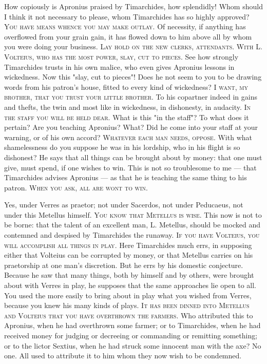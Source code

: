  How copiously is Apronius praised by Timarchides, how splendidly! Whom should I think it not necessary to please, whom Timarchides has so highly approved? \textsc{You have means whence you may make outlay}. Of necessity, if anything has overflowed from your grain gain, it has flowed down to him above all by whom you were doing your business. \textsc{Lay hold on the new clerks, attendants. With L. Volteius, who has the most power, slay, cut to pieces}. See how strongly Timarchides trusts in his own malice, who even gives Apronius lessons in wickedness. Now this "slay, cut to pieces"! Does he not seem to you to be drawing words from his patron's house, fitted to every kind of wickedness? \textsc{I want, my brother, that you trust your little brother}. To his copartner indeed in gains and thefts, the twin and most like in wickedness, in dishonesty, in audacity. \textsc{In the staff you will be held dear}. What is this "in the staff"? To what does it pertain? Are you teaching Apronius? What? Did he come into your staff at your warning, or of his own accord? \textsc{Whatever each man needs, oppose}. With what shamelessness do you suppose he was in his lordship, who in his flight is so dishonest? He says that all things can be brought about by money: that one must give, must spend, if one wishes to win. This is not so troublesome to me --- that Timarchides advises Apronius --- as that he is teaching the same thing to his patron. \textsc{When you ask, all are wont to win}.

 Yes, under Verres as praetor; not under Sacerdos, not under Peducaeus, not under this Metellus himself. \textsc{You know that Metellus is wise}. This now is not to be borne: that the talent of an excellent man, L. Metellus, should be mocked and contemned and despised by Timarchides the runaway. \textsc{If you have Volteius, you will accomplish all things in play}. Here Timarchides much errs, in supposing either that Volteius can be corrupted by money, or that Metellus carries on his praetorship at one man's discretion. But he errs by his domestic conjecture. Because he saw that many things, both by himself and by others, were brought about with Verres in play, he supposes that the same approaches lie open to all. You used the more easily to bring about in play what you wished from Verres, because you knew his many kinds of plays. \textsc{It has been dinned into Metellus and Volteius that you have overthrown the farmers}. Who attributed this to Apronius, when he had overthrown some farmer; or to Timarchides, when he had received money for judging or decreeing or commanding or remitting something; or to the lictor Sextius, when he had struck some innocent man with the axe? No one. All used to attribute it to him whom they now wish to be condemned.

